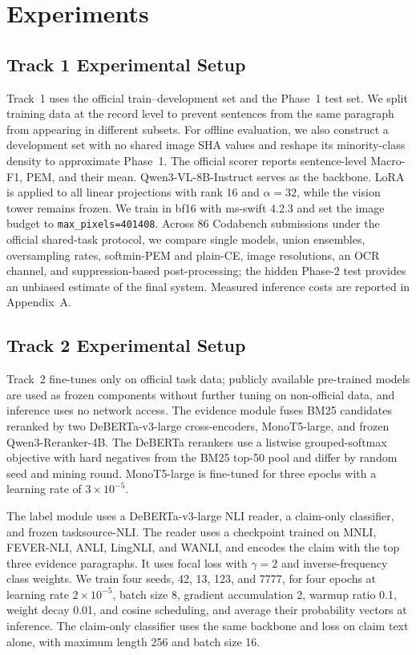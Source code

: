 \documentclass[runningheads]{llncs}
\newcommand{\mf}{Macro-F1}
\newcommand{\pem}{PEM}
\begin{document}
\section{Experiments}

\subsection{Track 1 Experimental Setup}
Track~1 uses the official train--development set and the Phase~1 test set. We split training data at the record level to prevent sentences from the same paragraph from appearing in different subsets. For offline evaluation, we also construct a development set with no shared image SHA values and reshape its minority-class density to approximate Phase~1. The official scorer reports sentence-level \mf{}, \pem{}, and their mean. Qwen3-VL-8B-Instruct serves as the backbone. LoRA is applied to all linear projections with rank 16 and $\alpha=32$, while the vision tower remains frozen. We train in bf16 with ms-swift 4.2.3 and set the image budget to \texttt{max\_pixels=401408}. Across 86 Codabench submissions under the official shared-task protocol, we compare single models, union ensembles, oversampling rates, softmin-PEM and plain-CE, image resolutions, an OCR channel, and suppression-based post-processing; the hidden Phase-2 test provides an unbiased estimate of the final system. Measured inference costs are reported in Appendix~A.

\subsection{Track 2 Experimental Setup}
Track~2 fine-tunes only on official task data; publicly available pre-trained models are used as frozen components without further tuning on non-official data, and inference uses no network access. The evidence module fuses BM25 candidates reranked by two DeBERTa-v3-large cross-encoders, MonoT5-large, and frozen Qwen3-Reranker-4B. The DeBERTa rerankers use a listwise grouped-softmax objective with hard negatives from the BM25 top-50 pool and differ by random seed and mining round. MonoT5-large is fine-tuned for three epochs with a learning rate of $3\times10^{-5}$.

The label module uses a DeBERTa-v3-large NLI reader, a claim-only classifier, and frozen tasksource-NLI. The reader uses a checkpoint trained on MNLI, FEVER-NLI, ANLI, LingNLI, and WANLI, and encodes the claim with the top three evidence paragraphs. It uses focal loss with $\gamma=2$ and inverse-frequency class weights. We train four seeds, 42, 13, 123, and 7777, for four epochs at learning rate $2\times10^{-5}$, batch size 8, gradient accumulation 2, warmup ratio 0.1, weight decay 0.01, and cosine scheduling, and average their probability vectors at inference. The claim-only classifier uses the same backbone and loss on claim text alone, with maximum length 256 and batch size 16.
\end{document}
